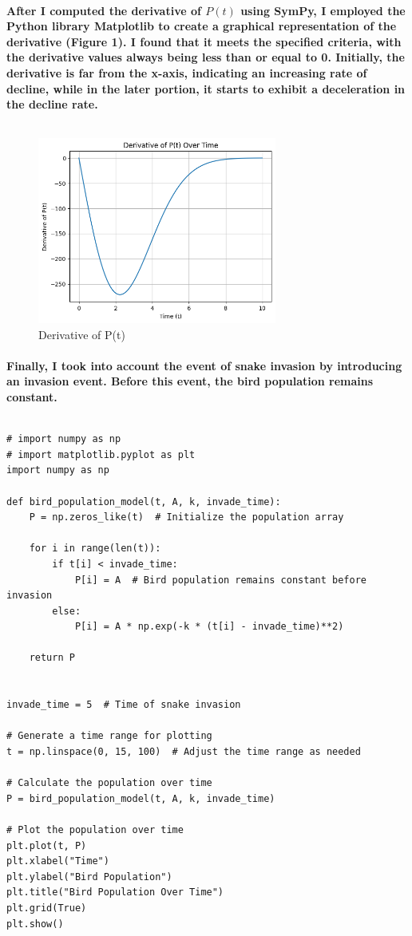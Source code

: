 \paragraph{After I computed the derivative of $P(t)$ using SymPy, I employed the Python library Matplotlib to create a graphical representation of the derivative (\textbf{Figure 1}). I found that it meets the specified criteria, with the derivative values always being less than or equal to 0. Initially, the derivative is far from the x-axis, indicating an increasing rate of decline, while in the later portion, it starts to exhibit a deceleration in the decline rate.}
% 
% 
% 
% 
% 
$$  $$
% 
% 
% 
% 
% 
% 
% 
\begin{figure}[H]
    \centering
    \includegraphics[width=0.7\textwidth]{pic/derivative_pt.png}
    \caption{Derivative of P(t)}
\end{figure}
% 
% 
% 
% 
% 
% 
% 
\paragraph{Finally, I took into account the event of snake invasion by introducing an invasion event. Before this event, the bird population remains constant.}
% 
$$  $$
% 
\begin{lstlisting}[style=pystyle]
# import numpy as np
# import matplotlib.pyplot as plt
import numpy as np

def bird_population_model(t, A, k, invade_time):
    P = np.zeros_like(t)  # Initialize the population array

    for i in range(len(t)):
        if t[i] < invade_time:
            P[i] = A  # Bird population remains constant before invasion
        else:
            P[i] = A * np.exp(-k * (t[i] - invade_time)**2)

    return P


invade_time = 5  # Time of snake invasion

# Generate a time range for plotting
t = np.linspace(0, 15, 100)  # Adjust the time range as needed

# Calculate the population over time
P = bird_population_model(t, A, k, invade_time)

# Plot the population over time
plt.plot(t, P)
plt.xlabel("Time")
plt.ylabel("Bird Population")
plt.title("Bird Population Over Time")
plt.grid(True)
plt.show()
\end{lstlisting}
% 
% 
% 
% 
% 
